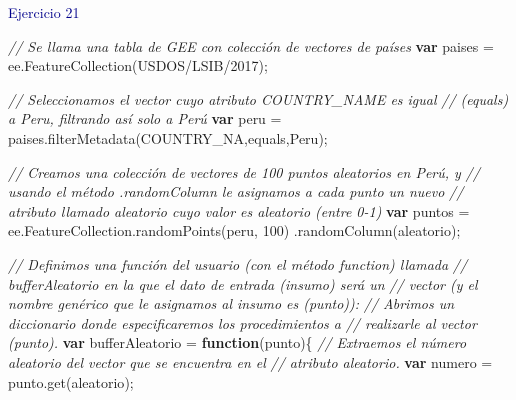 \documentclass[
  12pt,
  letterpaper,
  twoside]{book}
\newenvironment{Shaded}{\begin{snugshade}}{\end{snugshade}}
\newcommand{\AttributeTok}[1]{\textcolor[rgb]{0.48,0.12,0.64}{#1}}
\newcommand{\CommentTok}[1]{\textcolor[rgb]{0.24,0.58,0.00}{\textit{#1}}}
\newcommand{\DecValTok}[1]{\textcolor[rgb]{0.28,0.53,0.93}{#1}}
\newcommand{\FunctionTok}[1]{\textcolor[rgb]{0.48,0.12,0.64}{#1}}
\newcommand{\KeywordTok}[1]{\textcolor[rgb]{0.00,0.00,0.00}{\textbf{#1}}}
\newcommand{\NormalTok}[1]{#1}
\newcommand{\OperatorTok}[1]{\textcolor[rgb]{0.00,0.00,0.00}{#1}}
\newcommand{\StringTok}[1]{\textcolor[rgb]{0.87,0.29,0.22}{#1}}
\begin{document}
\textcolor{darkblue}{Ejercicio 21}

\begin{Shaded}
\begin{Highlighting}[]
\CommentTok{// Se llama una tabla de GEE con colección de vectores de países }
\KeywordTok{var}\NormalTok{ paises }\OperatorTok{=}\NormalTok{ ee}\OperatorTok{.}\FunctionTok{FeatureCollection}\NormalTok{(}\StringTok{\textquotesingle{}USDOS/LSIB/2017\textquotesingle{}}\NormalTok{)}\OperatorTok{;} 

\CommentTok{// Seleccionamos el vector cuyo atributo \textquotesingle{}COUNTRY\_NAME\textquotesingle{} es igual }
\CommentTok{// (\textquotesingle{}equals\textquotesingle{}) a \textquotesingle{}Peru\textquotesingle{}, filtrando así solo a Perú }
\KeywordTok{var}\NormalTok{ peru }\OperatorTok{=}\NormalTok{ paises}\OperatorTok{.}\FunctionTok{filterMetadata}\NormalTok{(}\StringTok{\textquotesingle{}COUNTRY\_NA\textquotesingle{}}\OperatorTok{,}\StringTok{\textquotesingle{}equals\textquotesingle{}}\OperatorTok{,}\StringTok{\textquotesingle{}Peru\textquotesingle{}}\NormalTok{)}\OperatorTok{;} 

\CommentTok{// Creamos una colección de vectores de 100 puntos aleatorios en Perú, y }
\CommentTok{// usando el método .randomColumn le asignamos a cada punto un nuevo }
\CommentTok{// atributo llamado \textquotesingle{}aleatorio\textquotesingle{} cuyo valor es aleatorio (entre 0{-}1)}
\KeywordTok{var}\NormalTok{ puntos }\OperatorTok{=}\NormalTok{ ee}\OperatorTok{.}\AttributeTok{FeatureCollection}\OperatorTok{.}\FunctionTok{randomPoints}\NormalTok{(peru}\OperatorTok{,} \DecValTok{100}\NormalTok{)}
  \OperatorTok{.}\FunctionTok{randomColumn}\NormalTok{(}\StringTok{\textquotesingle{}aleatorio\textquotesingle{}}\NormalTok{)}\OperatorTok{;}  

\CommentTok{// Definimos una función del usuario (con el método function) llamada }
\CommentTok{// \textquotesingle{}bufferAleatorio\textquotesingle{} en la que el dato de entrada (insumo) será un }
\CommentTok{// vector (y el nombre genérico que le asignamos al insumo es (punto)):}
\CommentTok{// Abrimos un diccionario donde especificaremos los procedimientos a }
\CommentTok{// realizarle al vector (punto).}
\KeywordTok{var}\NormalTok{ bufferAleatorio }\OperatorTok{=} \KeywordTok{function}\NormalTok{(punto)\{   }
  \CommentTok{// Extraemos el número aleatorio del vector que se encuentra en el }
  \CommentTok{// atributo \textquotesingle{}aleatorio\textquotesingle{}.}
  \KeywordTok{var}\NormalTok{ numero }\OperatorTok{=}\NormalTok{ punto}\OperatorTok{.}\FunctionTok{get}\NormalTok{(}\StringTok{\textquotesingle{}aleatorio\textquotesingle{}}\NormalTok{)}\OperatorTok{;}  
 

\end{Highlighting}
\end{Shaded}
\end{document}
